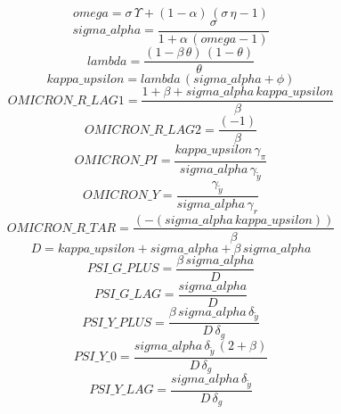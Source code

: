 \begin{dmath*}
omega = {\sigma}\, {\Upsilon}+\left(1-{\alpha}\right)\, \left({\sigma}\, {\eta}-1\right)
\end{dmath*}
\begin{dmath*}
sigma\_alpha = \frac{{\sigma}}{1+{\alpha}\, \left({omega}-1\right)}
\end{dmath*}
\begin{dmath*}
lambda = \frac{\left(1-{\beta}\, {\theta}\right)\, \left(1-{\theta}\right)}{{\theta}}
\end{dmath*}
\begin{dmath*}
kappa\_upsilon = {lambda}\, \left({sigma\_alpha}+{\phi}\right)
\end{dmath*}
\begin{dmath*}
OMICRON\_R\_LAG1 = \frac{1+{\beta}+{sigma\_alpha}\, {kappa\_upsilon}}{{\beta}}
\end{dmath*}
\begin{dmath*}
OMICRON\_R\_LAG2 = \frac{\left(-1\right)}{{\beta}}
\end{dmath*}
\begin{dmath*}
OMICRON\_PI = \frac{{kappa\_upsilon}\, {\gamma_{\pi}}}{{sigma\_alpha}\, {\gamma_{\tilde{y}}}}
\end{dmath*}
\begin{dmath*}
OMICRON\_Y = \frac{{\gamma_{\tilde{y}}}}{{sigma\_alpha}\, {\gamma_{r}}}
\end{dmath*}
\begin{dmath*}
OMICRON\_R\_TAR = \frac{\left(-\left({sigma\_alpha}\, {kappa\_upsilon}\right)\right)}{{\beta}}
\end{dmath*}
\begin{dmath*}
D = {kappa\_upsilon}+{sigma\_alpha}+{\beta}\, {sigma\_alpha}
\end{dmath*}
\begin{dmath*}
PSI\_G\_PLUS = \frac{{\beta}\, {sigma\_alpha}}{{D}}
\end{dmath*}
\begin{dmath*}
PSI\_G\_LAG = \frac{{sigma\_alpha}}{{D}}
\end{dmath*}
\begin{dmath*}
PSI\_Y\_PLUS = \frac{{\beta}\, {sigma\_alpha}\, {\delta_{\tilde{y}}}}{{D}\, {\delta_{g}}}
\end{dmath*}
\begin{dmath*}
PSI\_Y\_0 = \frac{{sigma\_alpha}\, {\delta_{\tilde{y}}}\, \left(2+{\beta}\right)}{{D}\, {\delta_{g}}}
\end{dmath*}
\begin{dmath*}
PSI\_Y\_LAG = \frac{{sigma\_alpha}\, {\delta_{\tilde{y}}}}{{D}\, {\delta_{g}}}
\end{dmath*}
